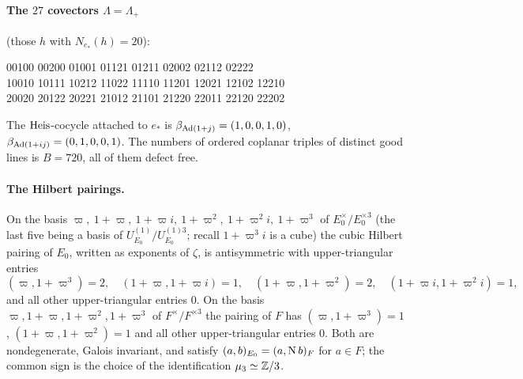 \paragraph{The $27$ covectors $\Lambda=\Lambda_+$} (those $h$ with $N_{e_*}(h)=20$):
\begin{center}\small{} 00100 00200 01001 01121 01211 02002 02112 02222\\
10010 10111 10212 11022 11110 11201 12021 12102 12210\\
20020 20122 20221 21012 21101 21220 22011 22120 22202
\end{center}
The $\mathrm{Heis}$-cocycle attached to $e_*$ is $\beta_{\operatorname{Ad}(1+j)}=(1,0,0,1,0)$,
$\beta_{\operatorname{Ad}(1+ij)}=(0,1,0,0,1)$.  The numbers of ordered coplanar
triples of distinct good lines is $B=720$, all of them defect free.
\paragraph{The Hilbert pairings.}  On the basis
$\varpi,\ 1+\varpi,\ 1+\varpi i,\ 1+\varpi^2,\ 1+\varpi^2i,\ 1+\varpi^3$ of
$E_0^\times/E_0^{\times3}$ (the last five being a basis of
$U^{(1)}_{E_0}/U^{(1)3}_{E_0}$; recall $1+\varpi^3 i$ is a cube) the cubic
Hilbert pairing of $E_0$, written as exponents of $\zeta$, is
antisymmetric with upper-triangular entries
\[
 (\varpi,1+\varpi^3)=2,\quad (1+\varpi,1+\varpi i)=1,\quad (1+\varpi,1+\varpi^2)=2,\quad
 (1+\varpi i,1+\varpi^2 i)=1,
\]
and all other upper-triangular entries $0$.  On the basis
$\varpi,1+\varpi,1+\varpi^2,1+\varpi^3$ of $F^\times/F^{\times3}$ the pairing of $F$
has $(\varpi,1+\varpi^3)=1$, $(1+\varpi,1+\varpi^2)=1$ and all other
upper-triangular entries $0$.  Both are nondegenerate, Galois
invariant, and satisfy $(a,b)_{E_0}=(a,\operatorname N b)_F$ for $a\in F$; the common
sign is the choice of the identification $\mu_3\simeq\mathbb Z/3$.

